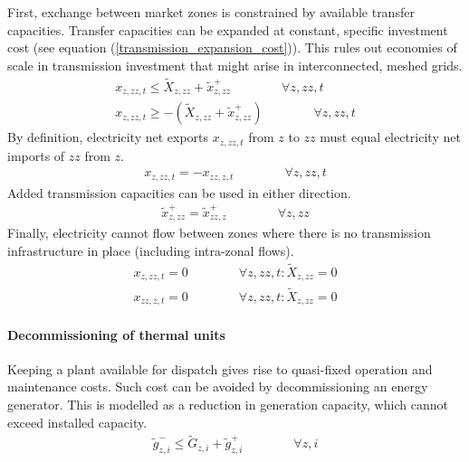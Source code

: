\documentclass[11pt,a4paper]{article}
\begin{document}
First, exchange between market zones is constrained by available transfer capacities. Transfer capacities can be expanded at constant, specific investment cost (see equation (\ref{transmission_expansion_cost})). This rules out economies of scale in transmission investment that might arise in interconnected, meshed grids.
\begin{align}
x_{z,zz,t} \leq \widetilde{X}_{z,zz} + \widetilde{x}^{+}_{z,zz} \qquad \qquad \forall z, zz, t \\
x_{z,zz,t} \geq - \left( \widetilde{X}_{z,zz} + \widetilde{x}^{+}_{z,zz} \right) \qquad \qquad \forall z, zz, t
\end{align}
By definition, electricity net exports $x_{z,zz,t}$ from $z$ to $zz$ must equal electricity net imports of $zz$ from $z$.
\begin{align}
x_{z,zz,t} = -x_{zz,z,t} \qquad \qquad \forall z, zz, t
\end{align}
Added transmission capacities can be used in either direction.
\begin{align}
\widetilde{x}^{+}_{z,zz} = \widetilde{x}^{+}_{zz,z} \qquad \qquad \forall z, zz
\end{align}
Finally, electricity cannot flow between zones where there is no transmission infrastructure in place (including intra-zonal flows).
\begin{align}
x_{z,zz,t} = 0 \qquad \qquad \forall z, zz, t: \widetilde{X}_{z,zz} = 0 \\
x_{zz,z,t} = 0 \qquad \qquad \forall z, zz, t: \widetilde{X}_{z,zz} = 0
\end{align}

\paragraph{Decommissioning of thermal units}
Keeping a plant available for dispatch gives rise to quasi-fixed operation and maintenance costs. 
Such cost can be avoided by decommissioning an energy generator. This is modelled as a reduction in generation capacity, which cannot exceed installed capacity.
\begin{align}
\widetilde{g}^{-}_{z,i} \leq \widetilde{G}_{z,i} + \widetilde{g}^{+}_{z,i} \qquad \qquad \forall z,i
\end{align}
\end{document}
